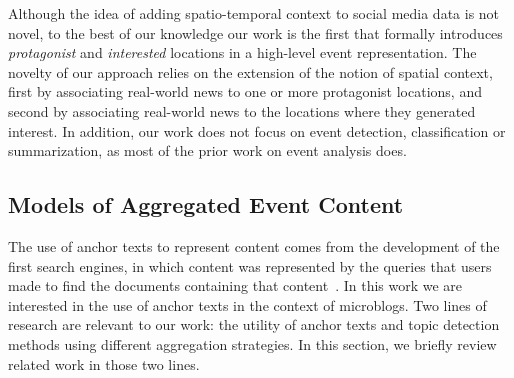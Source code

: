 
Although the idea of adding spatio-temporal context to social media data is
not novel, to the best of our knowledge our work is the first that formally
introduces {\em protagonist} and {\em interested} locations in a high-level
event representation.  
%
The novelty of our approach relies on the extension of the notion of spatial
context, first by associating real-world news to one or more protagonist
locations, and second by associating real-world news to the locations where they
generated interest.  
%
In addition, our work does not focus on event detection, classification or
summarization, as most of the prior work on event analysis does.




\subsection{Models of Aggregated Event Content}\label{sec:url-related}


The use of anchor texts to represent content comes from the
development of the first search engines, in which content was represented by the
queries that users made to find the documents containing that
content~\cite{10.1145/345508.345597,ilprints422,amitay1998using}.
%
In this work we are interested in the use of anchor texts in the context of
microblogs.
%
Two lines of research are relevant to our work: the utility of anchor
texts and topic detection methods using different aggregation
strategies. 
%
In this section, we briefly review related work in those two lines.

